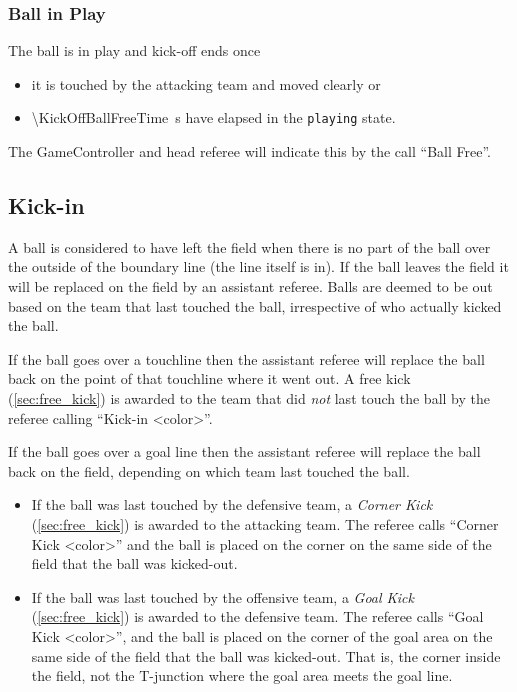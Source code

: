\subsubsection{Ball in Play}

The ball is in play and kick-off ends once
\begin{itemize}
  \item it is touched by the attacking team and moved clearly or
  \item \qty{\KickOffBallFreeTime}{\second} have elapsed in the \texttt{playing} state.
\end{itemize}

The GameController and head referee will indicate this by the call ``Ball Free''.

\subsection{Kick-in}
\label{sec:kick_in}

A ball is considered to have left the field when there is no part of the ball over the outside of the boundary line (\ie the line itself is in).
If the ball leaves the field it will be replaced on the field by an assistant referee.
Balls are deemed to be out based on the team that last touched the ball, irrespective of who actually kicked the ball.

If the ball goes over a touchline then the assistant referee will replace the ball back on the point of that touchline where it went out.
A free kick (\cf \cref{sec:free_kick}) is awarded to the team that did \emph{not} last touch the ball by the referee calling ``Kick-in \textless color\textgreater''.

If the ball goes over a goal line then the assistant referee will replace the ball back on the field, depending on which team last touched the ball.

\begin{itemize}
  \item If the ball was last touched by the defensive team, a \emph{Corner Kick} (\cf \cref{sec:free_kick}) is awarded to the attacking team.
    The referee calls ``Corner Kick \textless color\textgreater'' and the ball is placed on the corner on the same side of the field that the ball was kicked-out.
  \item If the ball was last touched by the offensive team, a \emph{Goal Kick} (\cf \cref{sec:free_kick}) is awarded to the defensive team.
    The referee calls ``Goal Kick \textless color\textgreater'', and the ball is placed on the corner of the goal area on the same side of the field that the ball was kicked-out.
    That is, the corner inside the field, not the T-junction where the goal area meets the goal line.
\end{itemize}


